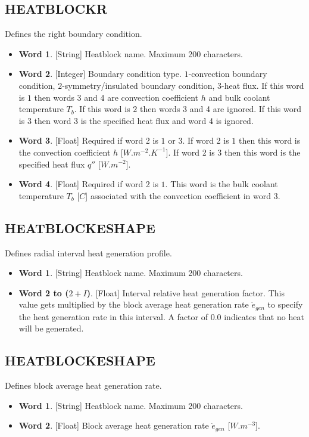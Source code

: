\documentclass[11pt,letterpaper,titlepage]{article}
\begin{document}
\subsection{HEATBLOCKR}
Defines the right boundary condition.
\begin{itemize}
\item \textbf{Word 1}. [String] Heatblock name. Maximum 200 characters.
\item \textbf{Word 2}. [Integer] Boundary condition type. $1$-convection boundary condition, $2$-symmetry/insulated boundary condition, $3$-heat flux. If this word is $1$ then words 3 and 4 are convection coefficient $h$ and bulk coolant temperature $T_b$. If this word is $2$ then words 3 and 4 are ignored. If this word is $3$ then word 3 is the specified heat flux and word 4 is ignored.
\item \textbf{Word 3}. [Float] Required if word 2 is $1$ or $3$. If word 2 is $1$ then this word is the convection coefficient $h$ [$W.m^{-2}.K^{-1}$]. If word 2 is $3$ then this word is the specified heat flux $q''$ [$W.m^{-2}$].
\item \textbf{Word 4}. [Float] Required if word 2 is $1$. This word is the bulk coolant temperature $T_b$ [$C$] associated with the convection coefficient in word 3.
\end{itemize}

\vspace{0.5cm}
\subsection{HEATBLOCKESHAPE}
Defines radial interval heat generation profile.
\begin{itemize}
\item \textbf{Word 1}. [String] Heatblock name. Maximum 200 characters.
\item \textbf{Word 2 to ($2+I$)}. [Float] Interval relative heat generation factor. This value gets multiplied by the block average heat generation rate $\dot{e}_{gen}$ to specify the heat generation rate in this interval. A factor of $0.0$ indicates that no heat will be generated.
\end{itemize}

\vspace{0.5cm}
\subsection{HEATBLOCKESHAPE}
Defines block average heat generation rate.
\begin{itemize}
\item \textbf{Word 1}. [String] Heatblock name. Maximum 200 characters.
\item \textbf{Word 2}. [Float] Block average heat generation rate $\dot{e}_{gen}$ [$W.m^{-3}$].
\end{itemize}
\end{document}

